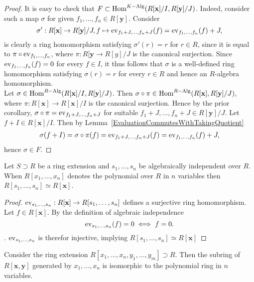 \begin{proof}
    It is easy to check that $F\subset \mathrm{Hom}^{K-\text{Alg}}(R[\mathbf{x}]/I,R[\mathbf{y}]/J)$. Indeed, consider such a map $\sigma$ for given $f_1,\dots,f_n\in R[\mathbf{y}]$. Consider $$\sigma' : R[\mathbf{x}] \rightarrow R[\mathbf{y}]/J, f \mapsto \mathrm{ev}_{f_1+J,\dots,f_n+J}(f) = \mathrm{ev}_{f_1,\dots,f_n}(f)+J,$$
    is clearly a ring homomorphism satisfying $\sigma'(r)=r$ for $r\in R$, since it is equal to $\pi\circ\mathrm{ev}_{f_1,\dots,f_n}$, where $\pi: R[\mathbf{y}\rightarrow R[y]/J$ is the canonical surjection. Since $\mathrm{ev}_{f_1,\dots,f_n}(f)=0$ for every $f\in I$, it thus follows that $\sigma$ is a well-defined ring homomorphism satisfying $\sigma(r)=r$ for every $r\in R$ and hence an $R$-algebra homomorphism.\\
    Let $\sigma \in\mathrm{Hom}^{R-\text{Alg}}(R[\mathbf{x}]/I,R[\mathbf{y}]/J)$. Then $\sigma\circ \pi \in \mathrm{Hom}^{R-\text{Alg}}(R[\mathbf{x}],R[\mathbf{y}]/J)$, where $\pi: R[\mathbf{x}]\rightarrow R[\mathbf{x}]/I$ is the canonical surjection. Hence by the prior corollary, $\sigma \circ \pi = \mathrm{ev}_{f_1+J,\dots,f_n+J}$ for suitable $f_1+J,\dots,f_n+J\in R[\mathbf{y}]/J$. Let $f+I \in R[\mathbf{x}]/I$. Then by Lemma~\ref{EvaluationCommutesWithTakingQuotient}
    \begin{align*}
        \sigma(f+I)=\sigma\circ \pi (f) = \mathrm{ev}_{f_1+J,\dots,f_n+J}(f) = \mathrm{ev}_{f_1,\dots,f_n}(f) + J,
    \end{align*}
    hence $\sigma \in F$.
\end{proof}
\begin{lemma}
    Let $S\supset R$ be a ring extension and $s_1,\dots,s_n$ be algebraically independent over $R$. When $R[x_1,\dots,x_n]$ denotes the polynomial over $R$ in $n$ variables then $R[s_1,\dots,s_n]\simeq R[\mathbf{x}]$.
\end{lemma}
\begin{proof}
    $\mathrm{ev}_{s_1,\dots,s_n} : R[\mathbf{x}]\rightarrow R[s_1,\dots,s_n]$ defines a surjective ring homomorphism. Let $f\in R[\mathbf{x}]$. By the definition of algebraic independence 
    $$\mathrm{ev}_{s_1,\dots,s_n}(f)=0 \iff f = 0.$$. $\mathrm{ev}_{s_1,\dots,s_n}$ is therefor injective, implying $R[s_1,\dots,s_n]\simeq R[\mathbf{x}]$
\end{proof}
\begin{corollary}
    Consider the ring extension $R[x_1,\dots,x_n,y_1,\dots,y_m]\supset R$. Then the subring of $R[\mathbf{x},\mathbf{y}]$ generated by $x_1,\dots,x_n$ is isomorphic to the polynomial ring in $n$ variables. 
\end{corollary}
